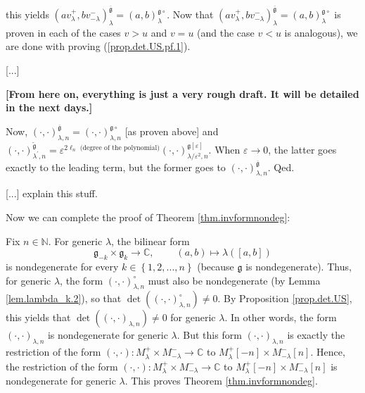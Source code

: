 \documentclass
[numbers=enddot,12pt,final,onecolumn,german,notitlepage]{scrartcl}%
\theoremstyle{definition}
\begin{document}
this yields $\left(  av_{\lambda}^{+},bv_{-\lambda}^{-}\right)  _{\lambda
}^{\overline{\mathfrak{g}}}=\left(  a,b\right)  _{\lambda}^{\mathfrak{g}\circ
}$. Now that $\left(  av_{\lambda}^{+},bv_{-\lambda}^{-}\right)  _{\lambda
}^{\overline{\mathfrak{g}}}=\left(  a,b\right)  _{\lambda}^{\mathfrak{g}\circ
}$ is proven in each of the cases $v>u$ and $v=u$ (and the case $v<u$ is
analogous), we are done with proving (\ref{prop.det.US.pf.1}).

[...]

\textbf{[From here on, everything is just a very rough draft. It will be
detailed in the next days.]}

Now, $\left(  \cdot,\cdot\right)  _{\lambda,n}^{\overline{\mathfrak{g}}%
}=\left(  \cdot,\cdot\right)  _{\lambda,n}^{\mathfrak{g}\circ}$ [as proven
above] and $\left(  \cdot,\cdot\right)  _{\lambda^{\prime},n}%
^{\widetilde{\mathfrak{g}}}=\varepsilon^{2\ell_{n}\text{ (degree of the
polynomial)}}\left(  \cdot,\cdot\right)  _{\lambda/\varepsilon^{2}%
,n}^{\mathfrak{g}\left[  \varepsilon\right]  }$. When $\varepsilon
\rightarrow0$, the latter goes exactly to the leading term, but the former
goes to $\left(  \cdot,\cdot\right)  _{\lambda,n}^{\overline{\mathfrak{g}}}$. Qed.

[...] explain this stuff.

Now we can complete the proof of Theorem \ref{thm.invformnondeg}:

Fix $n\in\mathbb{N}$. For generic $\lambda$, the bilinear form%
\[
\mathfrak{g}_{-k}\times\mathfrak{g}_{k}\rightarrow\mathbb{C}%
,\ \ \ \ \ \ \ \ \ \ \left(  a,b\right)  \mapsto\lambda\left(  \left[
a,b\right]  \right)
\]
is nondegenerate for every $k\in\left\{  1,2,...,n\right\}  $ (because
$\mathfrak{g}$ is nondegenerate). Thus, for generic $\lambda$, the form
$\left(  \cdot,\cdot\right)  _{\lambda,n}^{\circ}$ must also be nondegenerate
(by Lemma \ref{lem.lambda_k.2}), so that $\det\left(  \left(  \cdot
,\cdot\right)  _{\lambda,n}^{\circ}\right)  \neq0$. By Proposition
\ref{prop.det.US}, this yields that $\det\left(  \left(  \cdot,\cdot\right)
_{\lambda,n}\right)  \neq0$ for generic $\lambda$. In other words, the form
$\left(  \cdot,\cdot\right)  _{\lambda,n}$ is nondegenerate for generic
$\lambda$. But this form $\left(  \cdot,\cdot\right)  _{\lambda,n}$ is exactly
the restriction of the form $\left(  \cdot,\cdot\right)  :M_{\lambda}%
^{+}\times M_{-\lambda}^{-}\rightarrow\mathbb{C}$ to $M_{\lambda}^{+}\left[
-n\right]  \times M_{-\lambda}^{-}\left[  n\right]  $. Hence, the restriction
of the form $\left(  \cdot,\cdot\right)  :M_{\lambda}^{+}\times M_{-\lambda
}^{-}\rightarrow\mathbb{C}$ to $M_{\lambda}^{+}\left[  -n\right]  \times
M_{-\lambda}^{-}\left[  n\right]  $ is nondegenerate for generic $\lambda$.
This proves Theorem \ref{thm.invformnondeg}.
\end{document}
